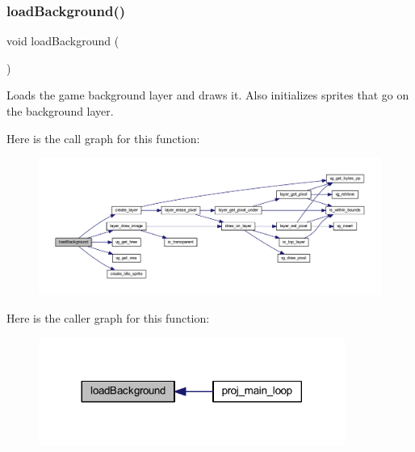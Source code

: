 \mbox{\label{group__pengoo_gab9e42b0ec1e9c9ffdf1edd5dec1b0ddd}} 
\subsubsection{\texorpdfstring{load\+Background()}{loadBackground()}}
{\footnotesize\ttfamily void load\+Background (\begin{DoxyParamCaption}{ }\end{DoxyParamCaption})}



Loads the game background layer and draws it. Also initializes sprites that go on the background layer. 

Here is the call graph for this function\+:\nopagebreak
\begin{figure}[H]
\begin{center}
\leavevmode
\includegraphics[width=350pt]{group__pengoo_gab9e42b0ec1e9c9ffdf1edd5dec1b0ddd_cgraph}
\end{center}
\end{figure}
Here is the caller graph for this function\+:\nopagebreak
\begin{figure}[H]
\begin{center}
\leavevmode
\includegraphics[width=284pt]{group__pengoo_gab9e42b0ec1e9c9ffdf1edd5dec1b0ddd_icgraph}
\end{center}
\end{figure}
\mbox{\label{group__pengoo_ga95635b27f6c1165153d2c11de57e60a8}} 
